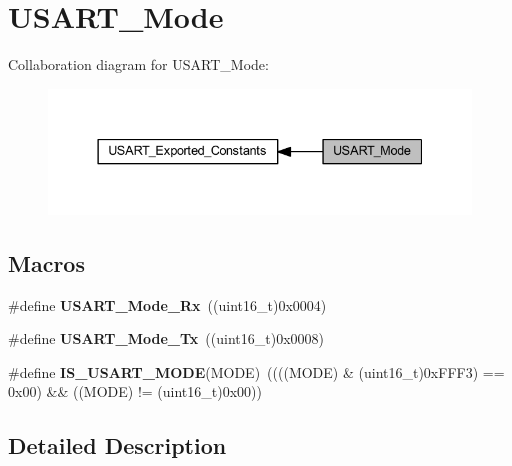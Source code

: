 \hypertarget{group___u_s_a_r_t___mode}{}\section{U\+S\+A\+R\+T\+\_\+\+Mode}
\label{group___u_s_a_r_t___mode}
Collaboration diagram for U\+S\+A\+R\+T\+\_\+\+Mode\+:\nopagebreak
\begin{figure}[H]
\begin{center}
\leavevmode
\includegraphics[width=337pt]{group___u_s_a_r_t___mode}
\end{center}
\end{figure}
\subsection*{Macros}
\begin{DoxyCompactItemize}
\item 
\mbox{\label{group___u_s_a_r_t___mode_gafefcc3d3c1a1f83b425784fa6289aecf}} 
\#define {\bfseries U\+S\+A\+R\+T\+\_\+\+Mode\+\_\+\+Rx}~((uint16\+\_\+t)0x0004)
\item 
\mbox{\label{group___u_s_a_r_t___mode_ga22b2813509a062435ea68d086ec565b4}} 
\#define {\bfseries U\+S\+A\+R\+T\+\_\+\+Mode\+\_\+\+Tx}~((uint16\+\_\+t)0x0008)
\item 
\mbox{\label{group___u_s_a_r_t___mode_gae9140e5ca405d2377fe0e82c79e136a2}} 
\#define {\bfseries I\+S\+\_\+\+U\+S\+A\+R\+T\+\_\+\+M\+O\+DE}(M\+O\+DE)~((((M\+O\+DE) \& (uint16\+\_\+t)0x\+F\+F\+F3) == 0x00) \&\& ((\+M\+O\+D\+E) != (uint16\+\_\+t)0x00))
\end{DoxyCompactItemize}


\subsection{Detailed Description}
